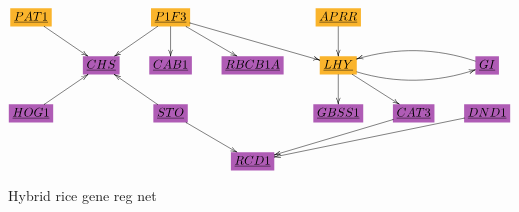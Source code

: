 \documentclass[12pt]{article}
\begin{document}
\begin{figure}[h!]\centering
$$\xymatrix{
*+[F*:Dandelion]{\underline{PAT1}}\ar[dr]&&*+[F*:Dandelion]{\underline{P1F3}}\ar[d]\ar[dl]\ar[drr]\ar[dr]&&*+[F*:Dandelion]{\underline{APRR}}\ar[d]&&
\\
&*+[F*:Orchid]{\underline{CHS}}&*+[F*:Orchid]{\underline{CAB1}}&*+[F*:Orchid]{\underline{RBCB1A}}&*+[F*:Dandelion]{\underline{LHY}}\ar[dr]\ar[d]\ar@/_1pc/[rr]&&*+[F*:Orchid]{\underline{GI}}\ar@/_1pc/[ll]
\\
*+[F*:Orchid]{\underline{HOG1}}\ar[ur]&&*+[F*:Orchid]{\underline{STO}}\ar[ul]\ar[dr]&&*+[F*:Orchid]{\underline{GBSS1}}&*+[F*:Orchid]{\underline{CAT3}}\ar[dll]&*+[F*:Orchid]{\underline{DND1}}\ar[dlll]
\\
&&&*+[F*:Orchid]{\underline{RCD1}}&&&
}$$
\caption{Hybrid rice gene reg net}
\label{fig-texnn-for-rice-gene-reg-net}
\end{figure}
\end{document}
